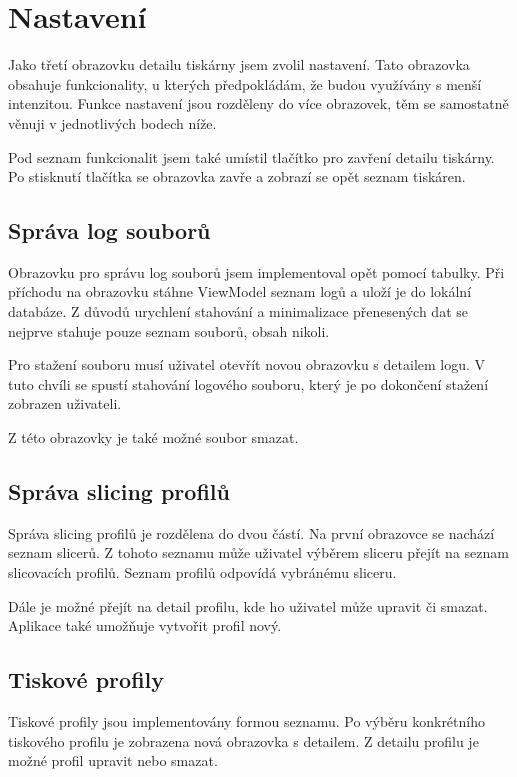 \section{Nastavení}

Jako třetí obrazovku detailu tiskárny jsem zvolil nastavení.
Tato obrazovka obsahuje funkcionality, u kterých předpokládám, že budou využívány s menší intenzitou.
Funkce nastavení jsou rozděleny do více obrazovek, těm se samostatně věnuji v jednotlivých bodech níže.

Pod seznam funkcionalit jsem také umístil tlačítko pro zavření detailu tiskárny.
Po stisknutí tlačítka se obrazovka zavře a zobrazí se opět seznam tiskáren.

\subsection{Správa log souborů}

Obrazovku pro správu log souborů jsem implementoval opět pomocí tabulky.
Při příchodu na obrazovku stáhne ViewModel seznam logů a uloží je do lokální databáze.
Z důvodů urychlení stahování a minimalizace přenesených dat se nejprve stahuje pouze seznam souborů, obsah nikoli.

Pro stažení souboru musí uživatel otevřít novou obrazovku s detailem logu.
V tuto chvíli se spustí stahování logového souboru, který je po dokončení stažení zobrazen uživateli.

Z této obrazovky je také možné soubor smazat.

\subsection{Správa slicing profilů}

Správa slicing profilů je rozdělena do dvou částí.
Na první obrazovce se nachází seznam slicerů.
Z tohoto seznamu může uživatel výběrem sliceru přejít na seznam slicovacích profilů.
Seznam profilů odpovídá vybránému sliceru.

Dále je možné přejít na detail profilu, kde ho uživatel může upravit či smazat.
Aplikace také umožňuje vytvořit profil nový.

\subsection{Tiskové profily}

Tiskové profily jsou implementovány formou seznamu.
Po výběru konkrétního tiskového profilu je zobrazena nová obrazovka s detailem.
Z detailu profilu je možné profil upravit nebo smazat.

